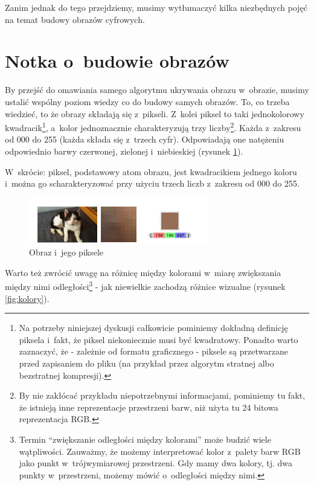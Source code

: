 \documentclass[12pt,a4paper]{article}
\begin{document}
    Zanim jednak do tego przejdziemy, musimy wytłumaczyć kilka niezbędnych pojęć na temat budowy obrazów cyfrowych.

\section{Notka o~budowie obrazów}
    By przejść do omawiania samego algorytmu ukrywania obrazu w~obrazie, musimy ustalić wspólny poziom wiedzy co do budowy samych obrazów. To, co trzeba wiedzieć, to że obrazy składają się z~pikseli. Z~kolei piksel to taki jednokolorowy kwadracik\footnote{Na potrzeby niniejszej dyskusji całkowicie pominiemy dokładną definicję piksela i~fakt, że piksel niekoniecznie musi być kwadratowy. Ponadto warto zaznaczyć, że - zależnie od formatu graficznego - piksele są przetwarzane przed zapisaniem do pliku (na przykład przez algorytm stratnej albo bezstratnej kompresji).}, a~kolor jednoznacznie charakteryzują trzy liczby\footnote{By nie zakłócać przykładu niepotrzebnymi informacjami, pominiemy tu fakt, że istnieją inne reprezentacje przestrzeni barw, niż użyta tu 24 bitowa reprezentacja RGB.}. Każda z~zakresu od 000 do 255 (każda składa się z~trzech cyfr). Odpowiadają one natężeniu odpowiednio barwy czerwonej, zielonej i~niebieskiej (rysunek \ref{fig:piksel}).

    W~skrócie: piksel, podstawowy atom obrazu, jest kwadracikiem jednego koloru i~można go scharakteryzować przy użyciu trzech liczb z~zakresu od 000 do 255.


    \begin{figure}[!h]
        \centering
        \includegraphics[width=0.7\textwidth]{pieces/piksel}
        \caption{Obraz i~jego piksele} \label{fig:piksel}
    \end{figure}

    Warto też zwrócić uwagę na różnicę między kolorami w~miarę zwiększania między nimi odległości\footnote{Termin ``zwiększanie odległości między kolorami'' może budzić wiele wątpliwości. Zauważmy, że możemy interpretować kolor z~palety barw RGB jako punkt w~trójwymiarowej przestrzeni. Gdy mamy dwa kolory, tj. dwa punkty w~przestrzeni, możemy mówić o~odległości między nimi.} - jak niewielkie zachodzą różnice wizualne (rysunek \ref{fig:kolory}).
\end{document}
